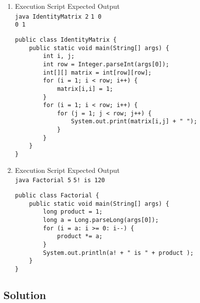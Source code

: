 \documentclass[12pt,letterpaper,twoside]{article}
\begin{document}
\begin{enumerate}[label=\textbf{(\alph*)}]
\item Execution Script \hfill Expected Output\\
\texttt{java IdentityMatrix 2} \hfill \texttt{1 0}\\ \raggedleft \texttt{0 1}

\begin{lstlisting}
public class IdentityMatrix {
	public static void main(String[] args) {
		int i, j;
		int row = Integer.parseInt(args[0]);
		int[][] matrix = int[row][row];
		for (i = 1; i < row; i++) {
			matrix[i,i] = 1;
		}
		for (i = 1; i < row; i++) {
			for (j = 1; j < row; j++) {
				System.out.print(matrix[i,j] + " ");
			}
		}
	}
}
\end{lstlisting}

\item Execution Script \hfill Expected Output\\
\texttt{java Factorial 5} \hfill \texttt{5! is 120}

\begin{lstlisting}
public class Factorial {
	public static void main(String[] args) {
		long product = 1;
		long a = Long.parseLong(args[0]);
		for (i = a: i >= 0: i--) {
			product *= a;
		}
		System.out.println(a! + " is " + product );
	}
}
\end{lstlisting}

\end{enumerate}

\subsection*{Solution}
\end{document}
